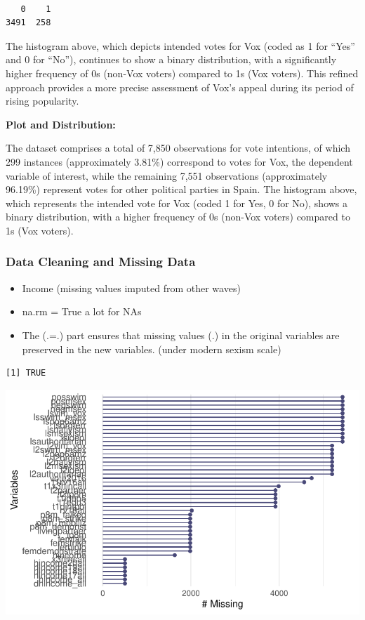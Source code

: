 \documentclass[
  letterpaper,
  DIV=11,
  numbers=noendperiod]{scrartcl}
\begin{document}
\begin{verbatim}

   0    1 
3491  258 
\end{verbatim}

The histogram above, which depicts intended votes for Vox (coded as 1
for ``Yes'' and 0 for ``No''), continues to show a binary distribution,
with a significantly higher frequency of 0s (non-Vox voters) compared to
1s (Vox voters). This refined approach provides a more precise
assessment of Vox's appeal during its period of rising popularity.

\textbf{Plot and Distribution:}

The dataset comprises a total of 7,850 observations for vote intentions,
of which 299 instances (approximately 3.81\%) correspond to votes for
Vox, the dependent variable of interest, while the remaining 7,551
observations (approximately 96.19\%) represent votes for other political
parties in Spain. The histogram above, which represents the intended
vote for Vox (coded 1 for Yes, 0 for No), shows a binary distribution,
with a higher frequency of 0s (non-Vox voters) compared to 1s (Vox
voters).

\subsubsection{Data Cleaning and Missing
Data}\label{data-cleaning-and-missing-data}

\begin{itemize}
\item
  Income (missing values imputed from other waves)
\item
  na.rm = True a lot for NAs
\item
  The (.=.) part ensures that missing values (.) in the original
  variables are preserved in the new variables. (under modern sexism
  scale)
\end{itemize}

\begin{verbatim}
[1] TRUE
\end{verbatim}

\includegraphics{reprod_sexism_files/figure-pdf/unnamed-chunk-4-1.pdf}
\end{document}
